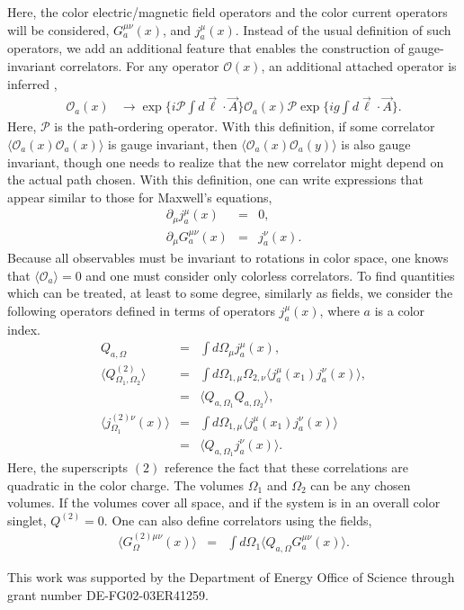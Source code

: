 \documentclass[aps, prc, 12pt, nofootinbib, showpacs, superscriptaddress, tightenlines, groupedaddress]{revtex4-2}
\begin{document}
Here, the color electric/magnetic field operators and the color current operators will be considered, $G^{\mu\nu}_a(x)$, and $j^\mu_a(x)$. Instead of the usual definition of such operators, we add an additional feature that enables the construction of gauge-invariant correlators. For any operator $\mathcal{O}(x)$, an additional attached operator is inferred \cite{Elze:1989un},
\begin{eqnarray}
\mathcal{O}_a(x)&\rightarrow \exp\{i\mathcal{P}\int d\vec{\ell}\cdot\vec{A}\}\mathcal{O}_a(x)\mathcal{P}\exp\{ig\int d\vec{\ell}\cdot\vec{A}\}.
\end{eqnarray}
Here, $\mathcal{P}$ is the path-ordering operator. With this definition, if some correlator $\langle\mathcal{O}_a(x)\mathcal{O}_a(x)\rangle$ is gauge invariant, then $\langle\mathcal{O}_a(x)\mathcal{O}_a(y)\rangle$ is also gauge invariant, though one needs to realize that the new correlator might depend on the actual path chosen. With this definition, one can write expressions that appear similar to those for Maxwell's equations,
\begin{eqnarray}
\partial_\mu j^\mu_a(x)&=&0,\\
\nonumber
\partial_\mu G^{\mu\nu}_a(x)&=&j^\nu_a(x).
\end{eqnarray}
Because all observables must be invariant to rotations in color space, one knows that $\langle\mathcal{O}_a\rangle=0$ and one must consider only colorless correlators. To find quantities which can be treated, at least to some degree, similarly as fields, we consider the following operators defined in terms of operators $j_a^\mu(x)$, where $a$ is a color index. 
\begin{eqnarray}
Q_{a,\Omega}&=&\int d\Omega_\mu j^{\mu}_a(x),\\
\nonumber
\langle Q^{(2)}_{\Omega_1,\Omega_2}\rangle&=&\int d\Omega_{1,\mu}\Omega_{2,\nu}\langle j^\mu_a(x_1) j^\nu_a(x)\rangle,\\
\nonumber
&=&\langle Q_{a,\Omega_1}Q_{a,\Omega_2}\rangle,\\
\nonumber
\langle j^{(2)\nu}_{\Omega_1}(x)\rangle &=&\int d\Omega_{1,\mu} \langle j^\mu_a(x_1) j^\nu_a(x)\rangle\\
\nonumber
&=&\langle Q_{a,\Omega_1}j^\nu_a(x)\rangle.
\end{eqnarray}
Here, the superscripts $(2)$ reference the fact that these correlations are quadratic in the color charge. The volumes $\Omega_1$ and $\Omega_2$ can be any chosen volumes. If the volumes cover all space, and if the system is in an overall color singlet, $Q^{(2)}=0$. One can also define correlators using the fields,
\begin{eqnarray}
\langle G^{(2)\mu\nu}_{\Omega}(x)\rangle&=&\int d\Omega_1\langle Q_{a,\Omega}G^{\mu\nu}_a(x)\rangle.
\end{eqnarray}

\begin{acknowledgments}
This work was supported by the Department of Energy Office of Science through grant number DE-FG02-03ER41259.
\end{acknowledgments}


\end{document}
